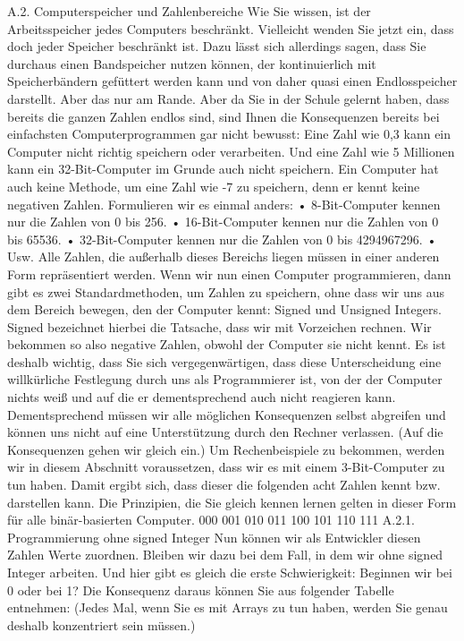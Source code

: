 A.2. Computerspeicher und Zahlenbereiche
Wie Sie wissen, ist der Arbeitsspeicher jedes Computers beschränkt. Vielleicht wenden Sie jetzt ein, dass doch jeder Speicher beschränkt ist. Dazu lässt sich allerdings sagen, dass Sie durchaus einen Bandspeicher nutzen können, der kontinuierlich mit Speicherbändern gefüttert werden kann und von daher quasi einen Endlosspeicher darstellt. Aber das nur am Rande.
Aber da Sie in der Schule gelernt haben, dass bereits die ganzen Zahlen endlos sind, sind Ihnen die Konsequenzen bereits bei einfachsten Computerprogrammen gar nicht bewusst: Eine Zahl wie 0,3 kann ein Computer nicht richtig speichern oder verarbeiten. Und eine Zahl wie 5 Millionen kann ein 32-Bit-Computer im Grunde auch nicht speichern. Ein Computer hat auch keine Methode, um eine Zahl wie -7 zu speichern, denn er kennt keine negativen Zahlen.
Formulieren wir es einmal anders:
•	8-Bit-Computer kennen nur die Zahlen von 0 bis 256.
•	16-Bit-Computer kennen nur die Zahlen von 0 bis 65536.
•	32-Bit-Computer kennen nur die Zahlen von 0 bis 4294967296.
•	Usw.
Alle Zahlen, die außerhalb dieses Bereichs liegen müssen in einer anderen Form repräsentiert werden.
Wenn wir nun einen Computer programmieren, dann gibt es zwei Standardmethoden, um Zahlen zu speichern, ohne dass wir uns aus dem Bereich bewegen, den der Computer kennt: Signed und Unsigned Integers. Signed bezeichnet hierbei die Tatsache, dass wir mit Vorzeichen rechnen. Wir bekommen so also negative Zahlen, obwohl der Computer sie nicht kennt. Es ist deshalb wichtig, dass Sie sich vergegenwärtigen, dass diese Unterscheidung eine willkürliche Festlegung durch uns als Programmierer ist, von der der Computer nichts weiß und auf die er dementsprechend auch nicht reagieren kann. Dementsprechend müssen wir alle möglichen Konsequenzen selbst abgreifen und können uns nicht auf eine Unterstützung durch den Rechner verlassen. (Auf die Konsequenzen gehen wir gleich ein.)
Um Rechenbeispiele zu bekommen, werden wir in diesem Abschnitt voraussetzen, dass wir es mit einem 3-Bit-Computer zu tun haben. Damit ergibt sich, dass dieser die folgenden acht Zahlen kennt bzw. darstellen kann. Die Prinzipien, die Sie gleich kennen lernen gelten in dieser Form für alle binär-basierten Computer.
000
001
010
011
100
101
110
111
A.2.1. Programmierung ohne signed Integer
Nun können wir als Entwickler diesen Zahlen Werte zuordnen. Bleiben wir dazu bei dem Fall, in dem wir ohne signed Integer arbeiten. Und hier gibt es gleich die erste Schwierigkeit: Beginnen wir bei 0 oder bei 1? Die Konsequenz daraus können Sie aus folgender Tabelle entnehmen: (Jedes Mal, wenn Sie es mit Arrays zu tun haben, werden Sie genau deshalb konzentriert sein müssen.)
